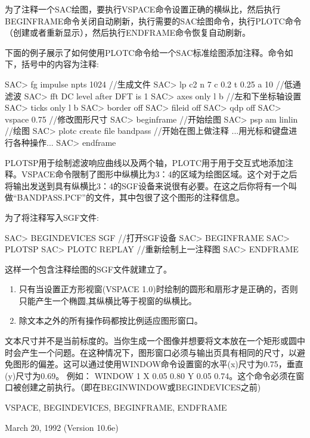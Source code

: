 为了注释一个SAC绘图，要执行VSPACE命令设置正确的横纵比，然后执行BEGINFRAME命令关闭自动刷新，执行需要的SAC绘图命令，执行PLOTC命令（创建或者重新显示），然后执行ENDFRAME命令恢复自动刷新。

下面的例子展示了如何使用PLOTC命令给一个SAC标准绘图添加注释。命令如下，括号中的内容为注释:
\begin{SACCode}
SAC> fg impulse npts 1024                      //生成文件
SAC> lp c2 n 7 c 0.2 t 0.25 a 10               //低通滤波 
SAC> fft
 DC level after DFT is 1
SAC> axes only l b                             //左和下坐标轴设置
SAC> ticks only l b
SAC> border off
SAC> fileid off
SAC> qdp off
SAC> vspace 0.75                              //修改图形尺寸
SAC> beginframe                               //开始绘图
SAC> psp am linlin                            //绘图
SAC> plotc create file bandpass               //开始在图上做注释
...用光标和键盘进行各种操作...
SAC> endframe
\end{SACCode}

PLOTSP用于绘制滤波响应曲线以及两个轴，PLOTC用于用于交互式地添加注释。VSPACE命令限制了图形中纵横比为3：4的区域为绘图区域。这个对于之后将输出发送到具有纵横比3：4的SGF设备来说很有必要。在这之后你将有一个叫做``BANDPASS.PCF''的文件，其中包很了这个图形的注释信息。

为了将注释写入SGF文件:
\begin{SACCode}
SAC> BEGINDEVICES SGF                       //打开SGF设备
SAC> BEGINFRAME
SAC> PLOTSP 
SAC> PLOTC REPLAY                           //重新绘制上一注释图
SAC> ENDFRAME
\end{SACCode}
这样一个包含注释绘图的SGF文件就建立了。

\begin{enumerate}
\item 只有当设置正方形视窗(VSPACE 1.0)时绘制的圆形和扇形才是正确的，否则只能产生一个椭圆,其纵横比等于视窗的纵横比。
\item 除文本之外的所有操作码都按比例适应图形窗口。
\end{enumerate}
文本尺寸并不是当前标度的。当你生成一个图像并想要将文本放在一个矩形或圆中时会产生一个问题。在这种情况下，图形窗口必须与输出页具有相同的尺寸，以避免图形的偏差。这可以通过使用WINDOW命令设置窗的水平(x)尺寸为0.75，垂直(y)尺寸为0.69。
例如： WINDOW 1 X 0.05 0.80 Y 0.05 0.74。这个命令必须在窗口被创建之前执行。（即在BEGINWINDOW或BEGINDEVICES之前)

VSPACE, BEGINDEVICES, BEGINFRAME, ENDFRAME

March 20, 1992 (Version 10.6e)

